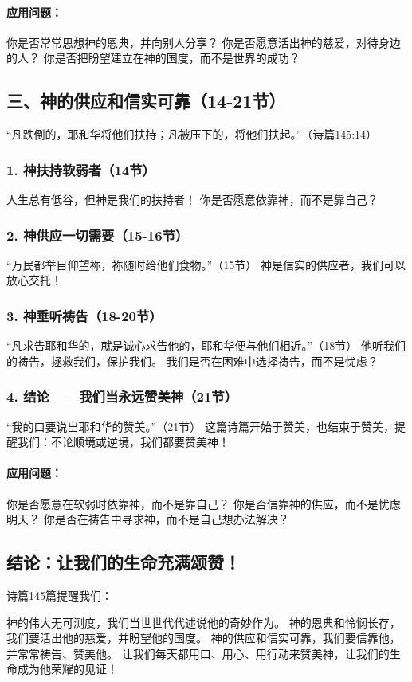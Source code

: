 \documentclass[a4paper, 12pt]{article}
\begin{document}
\paragraph*{应用问题：}
你是否常常思想神的恩典，并向别人分享？
你是否愿意活出神的慈爱，对待身边的人？
你是否把盼望建立在神的国度，而不是世界的成功？
\subsection*{三、神的供应和信实可靠（14-21节）}
“凡跌倒的，耶和华将他们扶持；凡被压下的，将他们扶起。”（诗篇145:14）

\subsubsection*{1. 神扶持软弱者（14节）}
人生总有低谷，但神是我们的扶持者！
你是否愿意依靠神，而不是靠自己？
\subsubsection*{2. 神供应一切需要（15-16节）}
“万民都举目仰望祢，祢随时给他们食物。”（15节）
神是信实的供应者，我们可以放心交托！
\subsubsection*{3. 神垂听祷告（18-20节）}
“凡求告耶和华的，就是诚心求告他的，耶和华便与他们相近。”（18节）
他听我们的祷告，拯救我们，保护我们。
我们是否在困难中选择祷告，而不是忧虑？
\subsubsection*{4. 结论——我们当永远赞美神（21节）}
“我的口要说出耶和华的赞美。”（21节）
这篇诗篇开始于赞美，也结束于赞美，提醒我们：不论顺境或逆境，我们都要赞美神！
\paragraph*{应用问题：}
你是否愿意在软弱时依靠神，而不是靠自己？
你是否信靠神的供应，而不是忧虑明天？
你是否在祷告中寻求神，而不是自己想办法解决？
\subsection*{结论：让我们的生命充满颂赞！}
诗篇145篇提醒我们：

神的伟大无可测度，我们当世世代代述说他的奇妙作为。
神的恩典和怜悯长存，我们要活出他的慈爱，并盼望他的国度。
神的供应和信实可靠，我们要信靠他，并常常祷告、赞美他。
让我们每天都用口、用心、用行动来赞美神，让我们的生命成为他荣耀的见证！
\end{document}
